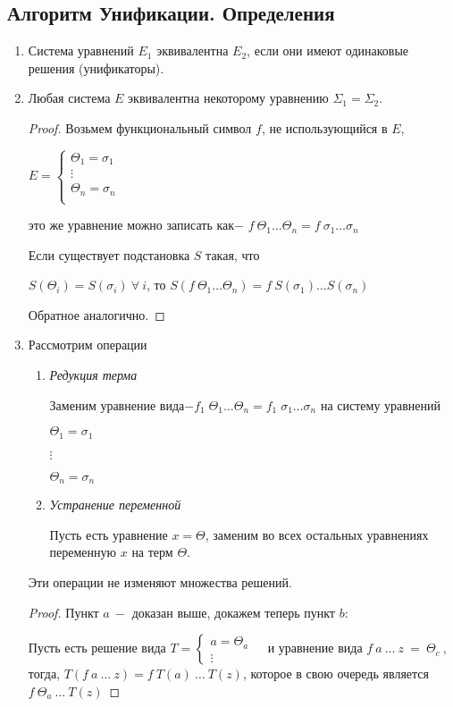 		\subsection{Алгоритм Унификации. Определения}
		\begin{enumerate}
			\item Система уравнений $E_1$ эквивалентна $E_2$, если они имеют одинаковые решения (унификаторы).
			\item Любая система $E$ эквивалентна некоторому уравнению $\Sigma_1=\Sigma_2$.

	\begin{proof}
		Возьмем функциональный символ $f$, не использующийся в $E$, \par
		$
		E=\begin{cases}
			\Theta_1=\sigma_1&\\
			\vdots&\\
			\Theta_n=\sigma_n&\\
		\end{cases}
		$\par
		это же уравнение можно записать как$-$ $f\:\Theta_1\hdots\Theta_n=f\:\sigma_1 \hdots\sigma_n$\par
		Если существует подстановка $S$ такая, что\par $S(\Theta_i)=S(\sigma_i)\:\forall\:i$,
		то $S(f\:\Theta_1\hdots\Theta_n)=f\:S(\sigma_1)\hdots S(\sigma_n)$ \par Обратное аналогично.\end{proof}
		\item Рассмотрим операции
		\begin{enumerate}
			\item \textit{Редукция терма} \par
					Заменим уравнение вида$-f_1\;\Theta_1 \hdots\Theta_n=f_1\;\sigma_1\hdots\sigma_n$ на систему уравнений\par$\Theta_1=\sigma_1$\par$\vdots$\par$\Theta_n=\sigma_n$
			\item \textit{Устранение переменной} \par
			Пусть есть уравнение $x=\Theta$, заменим во всех остальных уравнениях переменную $x$ на терм $\Theta$.
		\end{enumerate}
		\begin{statement} Эти операции не изменяют множества решений.
		\end{statement}
		\begin{proof} Пункт $a\:-$ доказан выше, докажем теперь пункт $b:$\par Пусть есть решение вида $T = \begin{cases} a = \Theta_a &\\ \vdots \end{cases}$
		и уравнение вида $f\:a\:\hdots\:z\:=\:\Theta_c\:$, тогда, $T(f\:a\:\hdots\:z) = f\:T(a)\:\hdots\:T(z)$, которое в свою очередь является $f\: \Theta_a\:\hdots\:T(z)$
		\end{proof}
	\end{enumerate}	

